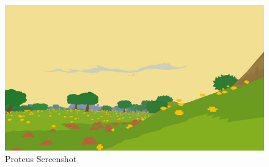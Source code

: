 \documentclass[a4paper,10pt]{article}
\begin{document}
\begin{figure}[H]
	\centerline{\includegraphics[scale= 0.4]{proteus.jpg}}
	\caption{Proteus Screenshot}
	\label{fig:proteus}
\end{figure}
\end{document}
